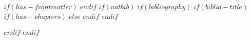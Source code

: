 \documentclass[
  11pt,
  a4paper,
  UKenglish,
  $for(classoption)$
    $classoption$$sep$,
  $endfor$
]{$documentclass$}
\begin{document}
\clearpage

\hypertarget{timesheet}{}

$if(has-frontmatter)$
  \backmatter
$endif$
$if(natbib)$
  $if(bibliography)$
    $if(biblio-title)$
      $if(has-chapters)$
        \renewcommand\bibname{$biblio-title$}
      $else$
        \renewcommand\refname{$biblio-title$}
      $endif$
    $endif$
    
  $endif$
$endif$
\end{document}
